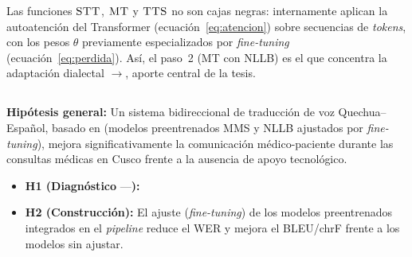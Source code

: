 \begin{bloqueNuevo}
\noindent Las funciones $\textsc{STT}$, $\textsc{MT}$ y $\textsc{TTS}$ no son cajas negras: internamente
aplican la autoatenci{\'o}n del Transformer (ecuaci{\'o}n~\ref{eq:atencion}) sobre secuencias de
\emph{tokens}, con los pesos $\theta$ previamente especializados por \emph{fine-tuning}
(ecuaci{\'o}n~\ref{eq:perdida}). As{\'i}, el paso~2 (MT con NLLB) es el que concentra la
adaptaci{\'o}n dialectal $\to$, aporte central de la tesis.
\end{bloqueNuevo}

\subsection{}
\begin{bloqueObsDos}
\noindent\textbf{Hip{\'o}tesis general:} Un sistema bidireccional de traducci{\'o}n de voz
Quechua--Espa{\~n}ol, basado en  (modelos preentrenados
MMS y NLLB ajustados por \emph{fine-tuning}), mejora significativamente la comunicaci{\'o}n m{\'e}dico-paciente durante las consultas
m{\'e}dicas en Cusco frente a la ausencia de apoyo tecnol{\'o}gico.
\begin{itemize}
  \item \textbf{H1 (Diagn{\'o}stico} ---\textbf{):} 
  \item \textbf{H2 (Construcci{\'o}n):} El ajuste (\emph{fine-tuning}) de los modelos preentrenados integrados en el \emph{pipeline} reduce el WER y mejora el BLEU/chrF frente a los modelos sin ajustar. 

\end{itemize}
\end{bloqueObsDos}
